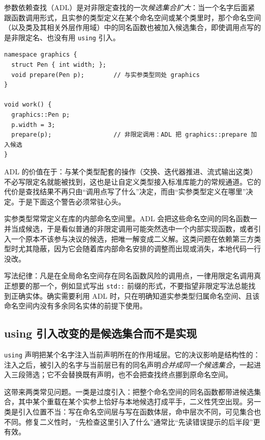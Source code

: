 \documentclass[12pt,a4paper,fontset=fandol]{ctexbook}
\newcommand{\Tp}[1]{\texttt{#1}}
\begin{document}
参数依赖查找（ADL）是对非限定查找的一次\emph{候选集合扩大}：当一个名字后面紧跟函数调用形式，且实参的类型定义在某个命名空间或某个类里时，那个命名空间（以及类及其相关外层作用域）中的同名函数也被加入候选集合，即使调用点写的是非限定名、也没有用 \Tp{using} 引入。

\begin{lstlisting}[style=cppstyle,caption={ADL 让一个非限定调用选中别的命名空间里的函数}]
namespace graphics {
  struct Pen { int width; };
  void prepare(Pen p);        // 与实参类型同处 graphics
}

void work() {
  graphics::Pen p;
  p.width = 3;
  prepare(p);                 // 非限定调用：ADL 把 graphics::prepare 加入候选
}
\end{lstlisting}

ADL 的价值在于：与某个类型配套的操作（交换、迭代器推进、流式输出这类）不必写限定名就能被找到，这也是让自定义类型接入标准库能力的常规通道。它的代价是查找结果不再只由“调用点写了什么”决定，而由“实参类型定义在哪里”决定。于是下面这个警告必须常驻心头。

\begin{warning}[title={ADL 会选中实现命名空间里的函数}]
实参类型常常定义在库的内部命名空间里。ADL 会把这些命名空间的同名函数一并当成候选，于是看似普通的非限定调用可能突然选中一个内部实现函数，或者引入一个原本不该参与决议的候选，把唯一解变成二义解。这类问题在依赖第三方类型时尤其隐蔽，因为它会随着库内部命名安排的调整而出现或消失，本地代码一行没改。

写法纪律：凡是在全局命名空间存在同名函数风险的调用点，一律用限定名调用真正想要的那一个，例如显式写出 \Tp{std::} 前缀的形式，不要指望非限定写法总能找到正确实体。确实需要利用 ADL 时，只在明确知道实参类型归属命名空间、且该命名空间内没有多余同名实体的前提下使用。
\end{warning}

\subsection{using 引入改变的是候选集合而不是实现}\label{sec:cl03-lookup-using}

\Tp{using} 声明把某个名字注入当前声明所在的作用域层。它的决议影响是结构性的：注入之后，被引入的名字与当前层已有的同名声明\emph{合并成同一个候选集合}，一起进入三段筛选；它不会替换既有声明，也不会把查找终点挪到原命名空间。

这带来两类常见问题。一类是过度引入：把整个命名空间的同名函数都带进候选集合，其中某个重载在某个实参上恰好与本地候选打成平手，二义性凭空出现。另一类是引入位置不当：写在命名空间层与写在函数体层，命中层次不同，可见集合也不同。修复二义性时，“先检查这里引入了什么”通常比“先读错误提示的后半段”更有效。
\end{document}
